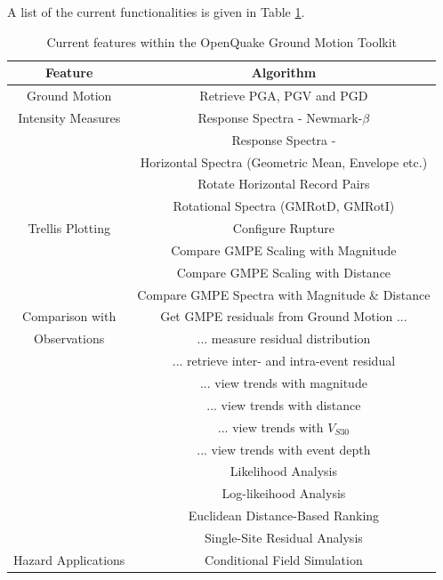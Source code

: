 A list of the current functionalities is given in Table \ref{tab:features}.

\begin{table}
\centering
\begin{tabular}{|c|c|} \hline
\textbf{Feature} & \textbf{Algorithm} \\ \hline
Ground Motion  &  Retrieve PGA, PGV and PGD \\
Intensity Measures  &  Response Spectra - Newmark-$\beta$ \\
  &   Response Spectra - \cite{NigamJennings1969} \\
  &   Horizontal Spectra (Geometric Mean, Envelope etc.) \\
  &   Rotate Horizontal Record Pairs \\
  &   Rotational Spectra (GMRotD, GMRotI) \cite{Boore_etal2006} \\ \hline
Trellis Plotting & Configure Rupture \\
                 & Compare GMPE Scaling with Magnitude \\
                 & Compare GMPE Scaling with Distance \\
                 & Compare GMPE Spectra with Magnitude \& Distance \\ \hline
Comparison with  & Get GMPE residuals from Ground Motion ... \\
Observations     & ... measure residual distribution \\
                 & ... retrieve inter- and intra-event residual \\
                 & ... view trends with magnitude \\
                 & ... view trends with distance \\
                 & ... view trends with $V_{S30}$ \\
                 & ... view trends with event depth \\
                 & Likelihood Analysis \cite{Scherbaum_etal2004}\\
                 & Log-likeihood Analysis \cite{Scherbaum_etal2009}\\
                 & Euclidean Distance-Based Ranking \cite{KaleAkkar2013}\\
                 & Single-Site Residual Analysis \\ \hline
Hazard Applications & Conditional Field Simulation \\ \hline
\end{tabular}
\caption{Current features within the OpenQuake Ground Motion Toolkit}
\label{tab:features}

\end{table}

